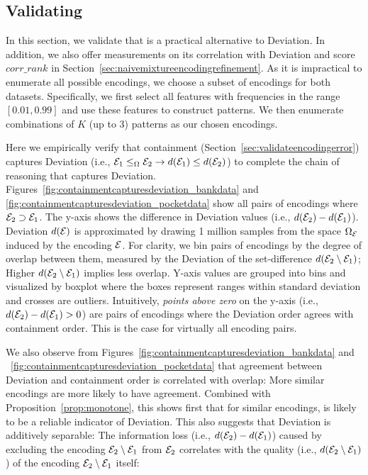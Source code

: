 \subsection{Validating \Errorname}
\label{sec:motivateencodingerror}
In this section, we validate that \errorname is a practical alternative to Deviation.
In addition, we also offer measurements on its correlation with Deviation and score $corr\_rank$ in Section~\ref{sec:naivemixtureencodingrefinement}.
%
As it is impractical to enumerate all possible encodings, we choose a subset of encodings for both datasets. 
Specifically, we first select all features with frequencies in the range $[0.01,0.99]$ and use these features to construct patterns.
We then enumerate combinations of $K$ (up to 3) patterns as our chosen encodings.

Here we empirically verify that containment (Section~\ref{sec:validateencodingerror}) captures Deviation (i.e., $\mathcal E_1\leq_{\Omega} \mathcal E_2\to d(\mathcal E_1)\leq d(\mathcal E_2)$) to complete the chain of reasoning that \errorname captures Deviation.
Figures~\ref{fig:containmentcapturesdeviation_bankdata} and \ref{fig:containmentcapturesdeviation_pocketdata} show all pairs of encodings where $\mathcal E_2\supset \mathcal E_1$.
The y-axis shows the difference in Deviation values (i.e., $d(\mathcal E_2)-d(\mathcal E_1)$).
Deviation $d(\mathcal E)$ is approximated by drawing 1 million samples from the space $\Omega_{\mathcal E}$ induced by the encoding $\mathcal E$.
For clarity, we bin pairs of encodings by the degree of overlap between them, measured by the Deviation of the set-difference $d(\mathcal E_2\setminus \mathcal E_1)$; Higher $d(\mathcal E_2\setminus \mathcal E_1)$ implies less overlap. 
Y-axis values are grouped into bins and visualized by boxplot where the boxes represent ranges within standard deviation and crosses are outliers.
Intuitively, \emph{points above zero} on the y-axis (i.e., $d(\mathcal E_2)-d(\mathcal E_1) > 0$) are pairs of encodings where the Deviation order agrees with containment order.
This is the case for virtually all encoding pairs.  

We also observe from Figures~\ref{fig:containmentcapturesdeviation_bankdata} and ~\ref{fig:containmentcapturesdeviation_pocketdata} that agreement between Deviation and containment order is correlated with overlap: More similar encodings are more likely to have agreement.
Combined with Proposition~\ref{prop:monotone}, this shows first that for similar encodings, \errorname is likely to be a reliable indicator of Deviation.
This also suggests that Deviation is additively separable: The information loss (i.e., $d(\mathcal E_2)-d(\mathcal E_1)$) caused by excluding the encoding $\mathcal E_2\setminus \mathcal E_1$ from $\mathcal E_2$ correlates with the quality (i.e., $d(\mathcal E_2\setminus \mathcal E_1)$) of the encoding $\mathcal E_2\setminus \mathcal E_1$ itself:\vspace*{-4mm}

